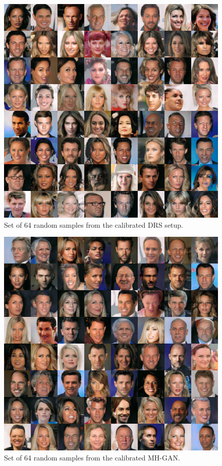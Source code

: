 \documentclass{article}
\newcommand{\exfactor}{1.0}
\begin{document}
\begin{figure}[htbp]
    \centering
    \includegraphics[width=\exfactor\textwidth]{figures/pgan/all_base_iso_reject_lq.jpg}
    \caption{
    Set of 64 random samples from the calibrated DRS setup.
    }
    \label{fig:DRS 64x}
\end{figure}

\begin{figure}[htbp]
    \centering
    \includegraphics[width=\exfactor\textwidth]{figures/pgan/all_base_iso_MH_lq.jpg}
    \caption{
    Set of 64 random samples from the calibrated MH-GAN\@.
    }
    \label{fig:MHGAN 64x}
\end{figure}






\end{document}
